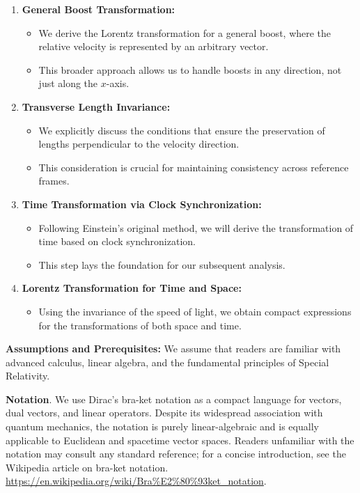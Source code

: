 \documentclass[12pt]{article}
\begin{document}
\begin{enumerate}
  \item \textbf{General Boost Transformation:}
    \begin{itemize}
      \item We derive the Lorentz transformation for a general boost, where the relative
            velocity is represented by an arbitrary vector.
      \item This broader approach allows us to handle boosts in any direction, not just along
            the $x$-axis.
    \end{itemize}
  \item \textbf{Transverse Length Invariance:}
    \begin{itemize}
      \item We explicitly discuss the conditions that ensure the preservation of lengths
            perpendicular to the velocity direction.
      \item This consideration is crucial for maintaining consistency across reference frames.
    \end{itemize}
  \item \textbf{Time Transformation via Clock Synchronization:}
    \begin{itemize}
      \item Following Einstein's original method, we will derive the transformation of time
            based on clock synchronization.
      \item This step lays the foundation for our subsequent analysis.
    \end{itemize}
  \item \textbf{Lorentz Transformation for Time and Space:}
    \begin{itemize}
      \item Using the invariance of the speed of light, we obtain compact expressions for the transformations of both space and time.
    \end{itemize}
\end{enumerate}

\textbf{Assumptions and Prerequisites:} We assume that readers are familiar with advanced
calculus, linear algebra, and the fundamental principles of Special Relativity.  \par

\textbf{Notation}. We use Dirac's bra-ket notation as a compact language for vectors, dual vectors, and linear operators. 
Despite its widespread association with quantum mechanics, the notation is purely linear-algebraic 
and is equally applicable to Euclidean and spacetime vector spaces. 
Readers unfamiliar with the notation may consult any standard reference; for a concise introduction, 
see the Wikipedia article on bra-ket notation. \url{https://en.wikipedia.org/wiki/Bra\%E2\%80\%93ket_notation}. \par
\end{document}
